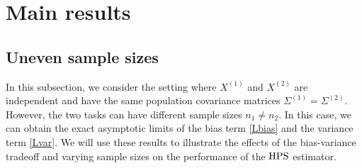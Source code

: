 \section{Main results}


\subsection{Uneven sample sizes}\label{sec_sizeratio}

 In this subsection, we consider the setting where $X^{(1)}$ and $X^{(2)}$ are independent and have the same population covariance matrices $\Sigma^{(1)}=\Sigma^{(2)}$. However, the two tasks can have different sample sizes $n_1\ne n_2$. In this case, we can obtain the exact asymptotic limits of the bias term \eqref{Lbias} and the variance term \eqref{Lvar}. We will use these results to illustrate the effects of the bias-variance tradeoff and varying sample sizes on the performance of the $\textup{HPS}$ estimator.

